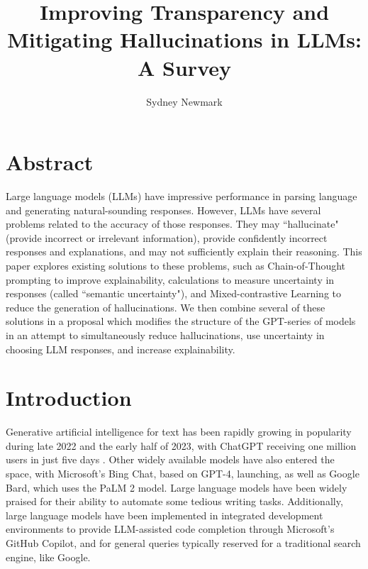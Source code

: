 \documentclass[letterpaper,12pt]{article}
\begin{document}
\title{Improving Transparency and Mitigating Hallucinations in LLMs: A Survey}
\author{Sydney Newmark}

\maketitle

\section{Abstract}
Large language models (LLMs) have impressive performance in parsing language and generating natural-sounding responses. However, LLMs have several problems related to the accuracy of those responses. They may ``hallucinate" (provide incorrect or irrelevant information), provide confidently incorrect responses and explanations, and may not sufficiently explain their reasoning. This paper explores existing solutions to these problems, such as Chain-of-Thought prompting to improve explainability, calculations to measure uncertainty in responses (called ``semantic uncertainty"), and Mixed-contrastive Learning to reduce the generation of hallucinations. We then combine several of these solutions in a proposal which modifies the structure of the GPT-series of models in an attempt to simultaneously reduce hallucinations, use uncertainty in choosing LLM responses, and increase explainability.

\section{Introduction}

Generative artificial intelligence for text has been rapidly growing in popularity during late 2022 and the early half of 2023, with ChatGPT receiving one million users in just five days \cite{statistachatgpt}. Other widely available models have also entered the space, with Microsoft's Bing Chat, based on GPT-4, launching, as well as Google Bard, which uses the PaLM 2 model. Large language models have been widely praised for their ability to automate some tedious writing tasks. Additionally, large language models have been implemented in integrated development environments to provide LLM-assisted code completion through Microsoft's GitHub Copilot, and for general queries typically reserved for a traditional search engine, like Google.
\end{document}
